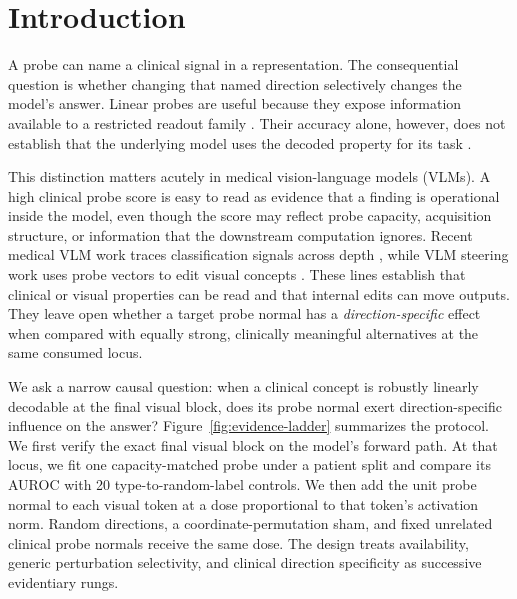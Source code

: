 \section{Introduction}
\label{sec:introduction}

A probe can name a clinical signal in a representation. The consequential question is whether changing that named direction selectively changes the model's answer. Linear probes are useful because they expose information available to a restricted readout family \citep{alain2017understanding,hewitt2019designing}. Their accuracy alone, however, does not establish that the underlying model uses the decoded property for its task \citep{ravichander2021probing}.

This distinction matters acutely in medical vision-language models (VLMs). A high clinical probe score is easy to read as evidence that a finding is operational inside the model, even though the score may reflect probe capacity, acquisition structure, or information that the downstream computation ignores. Recent medical VLM work traces classification signals across depth \citep{zhu2026lost}, while VLM steering work uses probe vectors to edit visual concepts \citep{theodoridis2026probing}. These lines establish that clinical or visual properties can be read and that internal edits can move outputs. They leave open whether a target probe normal has a \emph{direction-specific} effect when compared with equally strong, clinically meaningful alternatives at the same consumed locus.

We ask a narrow causal question: when a clinical concept is robustly linearly decodable at the final visual block, does its probe normal exert direction-specific influence on the answer? Figure~\ref{fig:evidence-ladder} summarizes the protocol. We first verify the exact final visual block on the model's forward path. At that locus, we fit one capacity-matched probe under a patient split and compare its AUROC with 20 type-to-random-label controls. We then add the unit probe normal to each visual token at a dose proportional to that token's activation norm. Random directions, a coordinate-permutation sham, and fixed unrelated clinical probe normals receive the same dose. The design treats availability, generic perturbation selectivity, and clinical direction specificity as successive evidentiary rungs.

